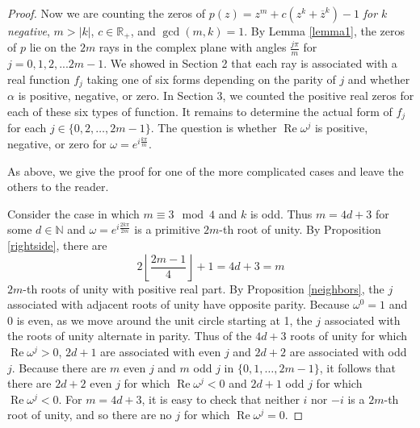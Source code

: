 \documentclass{amsart}
\renewcommand{\Re}{\operatorname{Re}}
\theoremstyle{definition}
\theoremstyle{remark}
\begin{document}
\begin{proof}
Now we are counting the zeros of  $p(z) = z^m+c(z^{k}+\overline{z}^{k})-1$ {\em for $k$ negative}, $m > |k|$, $c \in \mathbb{R}_+$, and $\gcd(m,k) = 1$. By Lemma \ref{lemma1}, the zeros of $p$ lie on the $2m$ rays in the complex plane with angles $\frac{j\pi}{m}$ for $j = 0,1,2,...2m-1$. We showed in Section 2 that each ray is associated with a real function $f_j$ taking one of six forms depending on the parity of $j$ and whether $\alpha$ is positive, negative, or zero. In Section 3, we counted the positive real zeros for each of these six types of function. It remains to determine the actual form of $f_j$ for each $j \in \{0,2,\ldots, 2m-1\}$. The question is whether $\Re  \omega^j$ is positive, negative, or zero for $\omega = e^{i\frac{k \pi}{m}}$. 

As above, we give the proof for one of the more complicated cases and leave the others to the reader.

Consider the case in which $m \equiv 3 \mod 4$ and $k$ is odd. Thus $m = 4d + 3$ for some $d \in \mathbb{N}$ and $\omega = e^{i\frac{2 k \pi}{2m}}$ is a primitive $2m$-th root of unity. By Proposition \ref{rightside}, there are 
\[
2\left\lfloor\frac{2m-1}{4}\right\rfloor + 1 = 4d + 3 = m 
\]
$2m$-th roots of unity with positive real part. By Proposition \ref{neighbors}, the $j$ associated with adjacent roots of unity have opposite parity. Because $\omega^0 = 1$ and $0$ is even, as we move around the unit circle starting at 1, the $j$ associated with the roots of unity alternate in parity. Thus of the $4d+3$ roots of unity for which $\Re \omega^j >0$, $2d+1$ are associated with even $j$ and $2d+2$ are associated with odd $j$. Because there are $m$ even $j$ and $m$ odd $j$ in $\{0,1,\ldots,2m-1\}$, it follows that there are $2d+2$ even $j$ for which $\Re \omega^j < 0$ and $2d+1$ odd $j$ for which $\Re \omega^j < 0$. For $m=4d+3$, it is easy to check that neither $i$ nor $-i$ is a $2m$-th root of unity, and so there are no $j$ for which $\Re \omega^j = 0$.  



\end{proof}
\end{document}
